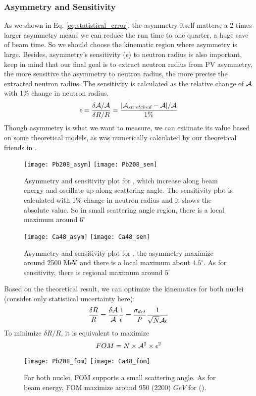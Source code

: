 \subsubsection{Asymmetry and Sensitivity}
As we shown in Eq. \ref{eq:statistical_error}, the asymmetry itself matters,
a 2 times larger asymmetry means we can reduce the run time to one quarter,
a huge save of beam time. So we should choose the kinematic region where
asymmetry is large. Besides, asymmetry's sensitivity ($\epsilon$) to neutron radius is
also important, keep in mind that our final goal is to extract neutron radius
from PV asymmetry, the more sensitive the asymmetry to neutron radius, the
more precise the extracted neutron radius. The sensitivity is calculated
as the relative change of $\mathcal{A}$ with 1\% change in neutron radius.
\begin{equation}
    \epsilon = \frac{\delta \mathcal{A}/\mathcal{A}}{\delta R/R} = \frac{|\mathcal{A}_{stretched} - \mathcal{A}|/\mathcal{A}}{1\%}
\end{equation}
Though asymmetry is what we want to measure, we can estimate its value based
on some theoretical models, as was numerically calculated by our theoretical 
friends in \cite{PhysRevC.57.3430}.
\begin{figure}[h!]
    \texttt{[image: Pb208\_asym]}
    \texttt{[image: Pb208\_sen]}
    \caption{Asymmetry and sensitivity plot for \Pb, which increase along beam 
    energy and oscillate up along scattering angle. The sensitivity plot is
    calculated with 1\% change in neutron radius and it shows the absolute value.
    So in small scattering angle region, there is a local maximum around $6^\circ$}
\end{figure}
\begin{figure}[h!]
    \texttt{[image: Ca48\_asym]}
    \texttt{[image: Ca48\_sen]}
    \caption{Asymmetry and sensitivity plot for \Ca, the asymmetry maximize around
    2500 MeV and there is a local maximum about $4.5^\circ$. As for sensitivity,
    there is regional maximum around $5^\circ$}
    \label{fig:ca48_asym_sen}
\end{figure}

Based on the theoretical result, we can optimize the kinematics for both nuclei 
(consider only statistical uncertainty here):
\begin{equation}
    \frac{\delta R}{R} = \frac{\delta \mathcal{A}}{\mathcal{A}} \frac{1}{\epsilon} 
	= \frac{\sigma_{det}}{P} \frac{1}{\sqrt{N} \mathcal{A} \epsilon}
\end{equation}
To minimize $\delta R/R$, it is equivalent to maximize 
\begin{equation}
    FOM = N\times \mathcal{A}^2 \times \epsilon^2
\end{equation}
\begin{figure}
    \texttt{[image: Pb208\_fom]}
    \texttt{[image: Ca48\_fom]}
    \caption{For both nuclei, FOM supports a small scattering angle. As for beam energy,
    FOM maximize around 950 (2200) $GeV$ for \Pb (\Ca).}
\end{figure}

